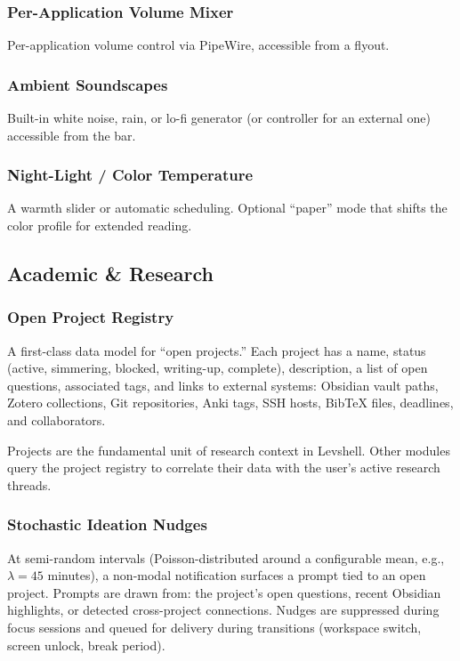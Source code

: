 \documentclass[11pt,a4paper]{article}
\begin{document}
\subsubsection{Per-Application Volume Mixer}
Per-application volume control via PipeWire, accessible from a flyout.

\subsubsection{Ambient Soundscapes}
Built-in white noise, rain, or lo-fi generator (or controller for an external one) accessible from the bar.

\subsubsection{Night-Light / Color Temperature}
A warmth slider or automatic scheduling. Optional ``paper'' mode that shifts the color profile for extended reading.


\subsection{Academic \& Research}
\label{sec:features-academic}

\subsubsection{Open Project Registry}
\label{sec:features-projects}
A first-class data model for ``open projects.'' Each project has a name, status (active, simmering, blocked, writing-up, complete), description, a list of open questions, associated tags, and links to external systems: Obsidian vault paths, Zotero collections, Git repositories, Anki tags, SSH hosts, BibTeX files, deadlines, and collaborators.

Projects are the fundamental unit of research context in Levshell. Other modules query the project registry to correlate their data with the user's active research threads.

\subsubsection{Stochastic Ideation Nudges}
At semi-random intervals (Poisson-distributed around a configurable mean, e.g., $\lambda = 45$ minutes), a non-modal notification surfaces a prompt tied to an open project. Prompts are drawn from: the project's open questions, recent Obsidian highlights, or detected cross-project connections. Nudges are suppressed during focus sessions and queued for delivery during transitions (workspace switch, screen unlock, break period).
\end{document}
